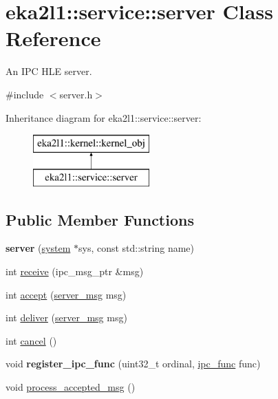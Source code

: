 \hypertarget{classeka2l1_1_1service_1_1server}{}\section{eka2l1\+:\+:service\+:\+:server Class Reference}
\label{classeka2l1_1_1service_1_1server}


An I\+PC H\+LE server.  




{\ttfamily \#include $<$server.\+h$>$}

Inheritance diagram for eka2l1\+:\+:service\+:\+:server\+:\begin{figure}[H]
\begin{center}
\leavevmode
\includegraphics[height=2.000000cm]{classeka2l1_1_1service_1_1server}
\end{center}
\end{figure}
\subsection*{Public Member Functions}
\begin{DoxyCompactItemize}
\item 
\mbox{\label{classeka2l1_1_1service_1_1server_a3cf17f9caaef7dff5f3adc7382efa1e3}} 
{\bfseries server} (\mbox{\hyperlink{classeka2l1_1_1system}{system}} $\ast$sys, const std\+::string name)
\item 
int \mbox{\hyperlink{classeka2l1_1_1service_1_1server_aa28629eb0ef30c5ebc645d1f1e0a0730}{receive}} (ipc\+\_\+msg\+\_\+ptr \&msg)
\item 
int \mbox{\hyperlink{classeka2l1_1_1service_1_1server_a91c56400274a88fc0e3334cc5b03fdff}{accept}} (\mbox{\hyperlink{structeka2l1_1_1service_1_1server__msg}{server\+\_\+msg}} msg)
\item 
int \mbox{\hyperlink{classeka2l1_1_1service_1_1server_afe6a3a01607dc045a9767ff57d57c266}{deliver}} (\mbox{\hyperlink{structeka2l1_1_1service_1_1server__msg}{server\+\_\+msg}} msg)
\item 
int \mbox{\hyperlink{classeka2l1_1_1service_1_1server_a14b31a4fdb52c29872317145254a1b4a}{cancel}} ()
\item 
\mbox{\label{classeka2l1_1_1service_1_1server_adfd4b5c97a122549ba7c37ed0b1b264b}} 
void {\bfseries register\+\_\+ipc\+\_\+func} (uint32\+\_\+t ordinal, \mbox{\hyperlink{structeka2l1_1_1service_1_1ipc__func}{ipc\+\_\+func}} func)
\item 
void \mbox{\hyperlink{classeka2l1_1_1service_1_1server_a6b80c69c4d159733c02a62c631c9f960}{process\+\_\+accepted\+\_\+msg}} ()
\end{DoxyCompactItemize}
